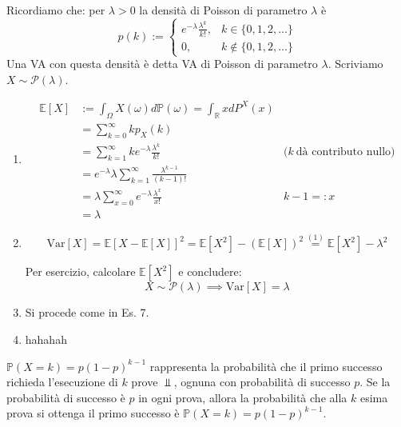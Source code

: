 Ricordiamo che: per $\lambda  >0$ la densità di Poisson di parametro $\lambda $ è
\begin{equation*}
p( k) :=\begin{cases}
e^{-\lambda }\frac{\lambda ^{k}}{k!} , & k\in \{0,1,2,\dotsc \}\\
0, & k\notin \{0,1,2,\dotsc \}
\end{cases}
\end{equation*}
Una VA con questa densità è detta VA di Poisson di parametro $\lambda $. Scriviamo $X\sim \mathcal{P}( \lambda )$.
\begin{enumerate}
\item \begin{equation*}
\begin{aligned}
\mathbb{E}[ X] & :=\int _{\Omega } X( \omega ) d\mathbb{P}( \omega ) =\int _{\mathbb{R}} xdP^{X}( x) & \\
 & =\sum\limits _{k=0}^{\infty } kp_{X}( k) & \\
 & =\sum\limits _{k=1}^{\infty } ke^{-\lambda }\frac{\lambda ^{k}}{k!} & \text{(} k\ \text{dà contributo nullo)}\\
 & =e^{-\lambda } \lambda \sum\limits _{k=1}^{\infty }\frac{\lambda ^{k-1}}{( k-1) !} & \\
 & =\lambda \sum\limits _{x=0}^{\infty } e^{-\lambda }\frac{\lambda ^{x}}{x!} & k-1=:x\\
 & =\lambda  & 
\end{aligned}
\end{equation*}
\item \begin{equation*}
\mathrm{Var}[ X] =\mathbb{E}[ X-\mathbb{E}[ X]]^{2} =\mathbb{E}\left[ X^{2}\right] -(\mathbb{E}[ X])^{2}\overset{( 1)}{=}\mathbb{E}\left[ X^{2}\right] -\lambda ^{2}
\end{equation*}

Per esercizio, calcolare $\mathbb{E}\left[ X^{2}\right]$ e concludere:\begin{equation*}
X\sim \mathcal{P}( \lambda ) \implies \mathrm{Var}[ X] =\lambda 
\end{equation*}
\item Si procede come in Es. 7.
\item hahahah
\end{enumerate}
\Soluzione
\begin{oss}
$\mathbb{P}( X=k) =p( 1-p)^{k-1}$ rappresenta la probabilità che il primo successo richieda l'esecuzione di $k$ prove $\Bot $, ognuna con probabilità di successo $p$. Se la probabilità di successo è $p$ in ogni prova, allora la probabilità che alla $k$ esima prova si ottenga il primo successo è $\mathbb{P}( X=k) =p( 1-p)^{k-1}$.
\end{oss}
